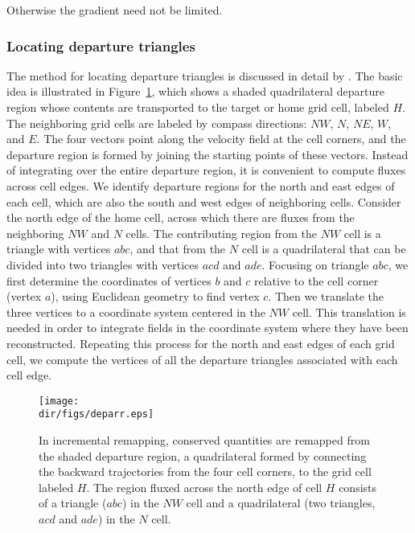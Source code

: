 \noindent
Otherwise the gradient need not be limited.

\subsubsection{Locating departure triangles}
\label{sc:glissade-IR-departure} 

The method for locating departure triangles is discussed in detail by 
\citet{Dukowicz2000}. The basic idea is illustrated in Figure~\ref{fig:gliss.deparr}, 
which shows a shaded quadrilateral departure region whose contents are transported to
the target or home grid cell, labeled $H$. The neighboring grid
cells are labeled by compass directions: $NW$, $N$, $NE$, $W$, and
$E$.  The four vectors point along the velocity field at the cell
corners, and the departure region is formed by joining the
starting points of these vectors.  Instead of integrating over the
entire departure region, it is convenient to compute fluxes across
cell edges.  We identify departure regions for the north and east
edges of each cell, which are also the south and west edges of
neighboring cells. Consider the north edge of the home cell,
across which there are fluxes from the neighboring $NW$ and $N$
cells. The contributing region from the $NW$ cell is a triangle
with vertices $abc$, and that from the $N$ cell is a quadrilateral
that can be divided into two triangles with vertices $acd$ and
$ade$. Focusing on triangle $abc$, we first determine the
coordinates of vertices $b$ and $c$ relative to the cell corner
(vertex $a$), using Euclidean geometry to find vertex $c$. Then we
translate the three vertices to a coordinate system centered in
the $NW$ cell.  This translation is needed in order to integrate
fields in the coordinate system where they have been reconstructed.
Repeating this process for the north and east edges of each grid cell, we compute the
vertices of all the departure triangles associated with each cell
edge.



\begin{figure}
  \begin{center}
    \texttt{[image: \\dir/figs/deparr.eps]}
  \end{center}
  \caption{In incremental remapping, conserved quantities are remapped from the shaded departure region, a quadrilateral formed by connecting the backward trajectories from the four cell corners, to the grid cell labeled $H$. The region fluxed across the north edge of cell $H$ consists of a triangle ($abc$) in the $NW$ cell and a quadrilateral (two triangles, $acd$ and $ade$) in the $N$ cell.}
  \label{fig:gliss.deparr}
\end{figure}



